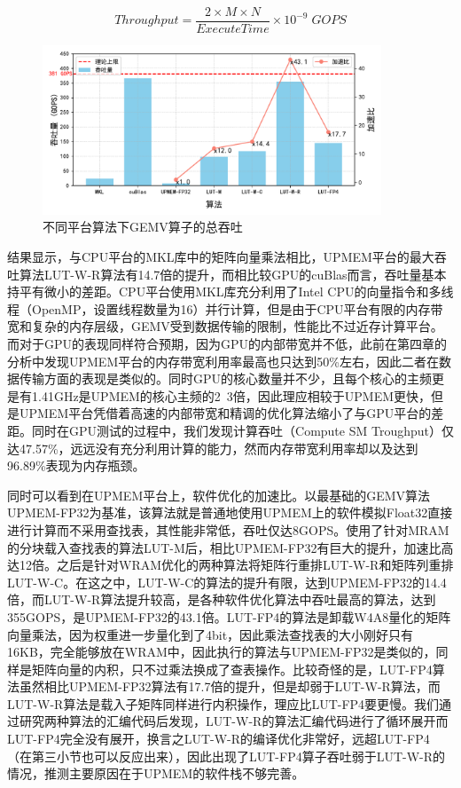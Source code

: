 \begin{equation}
    Throughput=\frac{2\times M\times N}{ExecuteTime}\times 10^{-9}\; GOPS
    \label{GOPsEqu}
\end{equation}

\begin{figure}[!htbp]
    \centering
    \includegraphics[width=0.9\textwidth]{figures/Exp1-1.pdf}
    \caption{不同平台算法下GEMV算子的总吞吐}
	\label{EXP1-1}
\end{figure}

结果显示，与CPU平台的MKL库中的矩阵向量乘法相比，UPMEM平台的最大吞吐算法LUT-W-R算法有14.7倍的提升，而相比较GPU的cuBlas而言，吞吐量基本持平有微小的差距。CPU平台使用MKL库充分利用了Intel CPU的向量指令和多线程（OpenMP，设置线程数量为16）并行计算，但是由于CPU平台有限的内存带宽和复杂的内存层级，GEMV受到数据传输的限制，性能比不过近存计算平台。而对于GPU的表现同样符合预期，因为GPU的内部带宽并不低，此前在第四章的分析中发现UPMEM平台的内存带宽利用率最高也只达到50\%左右，因此二者在数据传输方面的表现是类似的。同时GPU的核心数量并不少，且每个核心的主频更是有1.41GHz是UPMEM的核心主频的2~3倍，因此理应相较于UPMEM更快，但是UPMEM平台凭借着高速的内部带宽和精调的优化算法缩小了与GPU平台的差距。同时在GPU测试的过程中，我们发现计算吞吐（Compute SM Troughput）仅达47.57\%，远远没有充分利用计算的能力，然而内存带宽利用率却以及达到96.89\%表现为内存瓶颈。

同时可以看到在UPMEM平台上，软件优化的加速比。以最基础的GEMV算法UPMEM-FP32为基准，该算法就是普通地使用UPMEM上的软件模拟Float32直接进行计算而不采用查找表，其性能非常低，吞吐仅达8GOPS。使用了针对MRAM的分块载入查找表的算法LUT-M后，相比UPMEM-FP32有巨大的提升，加速比高达12倍。之后是针对WRAM优化的两种算法将矩阵行重排LUT-W-R和矩阵列重排LUT-W-C。在这之中，LUT-W-C的算法的提升有限，达到UPMEM-FP32的14.4倍，而LUT-W-R算法提升较高，是各种软件优化算法中吞吐最高的算法，达到355GOPS，是UPMEM-FP32的43.1倍。LUT-FP4的算法是卸载W4A8量化的矩阵向量乘法，因为权重进一步量化到了4bit，因此乘法查找表的大小刚好只有16KB，完全能够放在WRAM中，因此执行的算法与UPMEM-FP32是类似的，同样是矩阵向量的内积，只不过乘法换成了查表操作。比较奇怪的是，LUT-FP4算法虽然相比UPMEM-FP32算法有17.7倍的提升，但是却弱于LUT-W-R算法，而LUT-W-R算法是载入子矩阵同样进行内积操作，理应比LUT-FP4要更慢。我们通过研究两种算法的汇编代码后发现，LUT-W-R的算法汇编代码进行了循环展开而LUT-FP4完全没有展开，换言之LUT-W-R的编译优化非常好，远超LUT-FP4（在第三小节也可以反应出来），因此出现了LUT-FP4算子吞吐弱于LUT-W-R的情况，推测主要原因在于UPMEM的软件栈不够完善。

